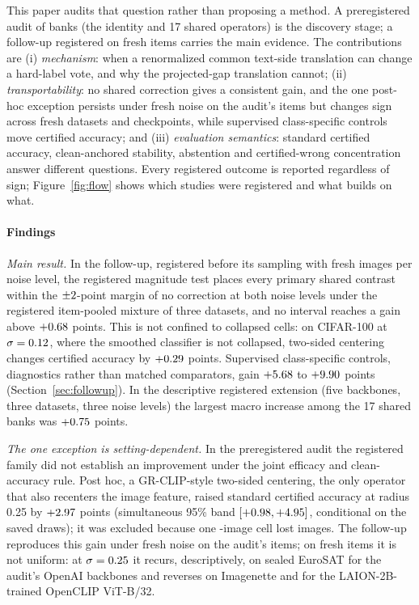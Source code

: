 This paper audits that question rather than proposing a method. A
preregistered audit of \ExpCandidates{} banks (the identity and 17 shared
operators) is the discovery stage; a follow-up registered on fresh items
carries the main evidence. The contributions are (i) \emph{mechanism}: when a
renormalized common text-side translation can change a hard-label vote, and
why the projected-gap translation cannot; (ii) \emph{transportability}: no
shared correction gives a consistent gain, and the one post-hoc exception
persists under fresh noise on the audit's items but changes sign across fresh
datasets and checkpoints, while supervised class-specific controls move
certified accuracy; and (iii) \emph{evaluation semantics}: standard certified
accuracy, clean-anchored stability, abstention and certified-wrong
concentration answer different questions. Every registered outcome is reported
regardless of sign; Figure~\ref{fig:flow} shows which studies were registered
and what builds on what.



\paragraph{Findings}
\emph{Main result.} In the follow-up, registered before its sampling with
\FUImagesB{} fresh images per noise level, the registered magnitude test
places every primary shared contrast within the $\pm2$-point margin of
no correction at both noise levels under the registered item-pooled mixture of
three datasets, and no interval reaches a gain above $+0.68$ points.
This is not confined to collapsed cells: on CIFAR-100 at
$\sigma=0.12$, where the smoothed classifier is not collapsed, two-sided
centering changes certified accuracy by $+0.29$ points. Supervised
class-specific controls, diagnostics rather than matched comparators, gain
$+5.68$ to $+9.90$ points (Section~\ref{sec:followup}). In
the descriptive registered extension (five backbones, three datasets, three
noise levels) the largest macro increase among the 17 shared banks was
$+0.75$ points.

\emph{The one exception is setting-dependent.} In the preregistered audit the
registered family did not establish an improvement under the joint efficacy
and clean-accuracy rule. Post hoc, a
GR-CLIP-style two-sided centering, the only operator that also recenters the
image feature, raised standard certified accuracy at radius 0.25 by
$+2.97$ points (simultaneous 95\% band $[+0.98,+4.95]$,
conditional on the saved draws); it was excluded because one
\ExpEurosatItemsPerCell-image cell lost \GRWorstCellImages{} images. The
follow-up reproduces this gain under fresh noise on the audit's items; on
fresh items it is not uniform: at $\sigma=0.25$ it recurs,
descriptively, on sealed EuroSAT for the audit's OpenAI backbones and reverses
on Imagenette and for the LAION-2B-trained OpenCLIP ViT-B/32.

